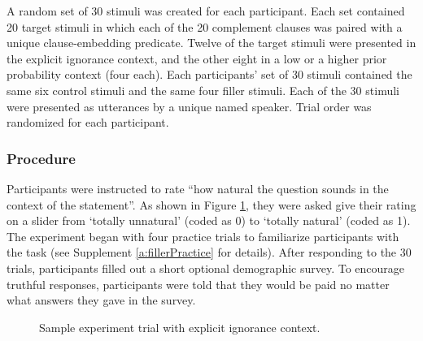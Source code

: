 \documentclass[11pt,fleqn]{article}
\newcommand{\6}{\mbox{$[\hspace*{-.6mm}[$}}
\newcommand{\9}{\mbox{$]\hspace*{-.6mm}]$}}
\begin{document}
A random set of 30 stimuli was created for each participant. Each set contained 20 target stimuli in which each of the 20 complement clauses was paired with a unique clause-embedding predicate. Twelve of the target stimuli were presented in the explicit ignorance context, and the other eight in a low or a higher prior probability context (four each). Each participants' set of 30 stimuli contained the same six control stimuli and the same four filler stimuli. Each of the 30 stimuli were presented as utterances by a unique named speaker. Trial order was randomized for each participant. 

\subsubsection{Procedure}

Participants were instructed to rate ``how natural the question sounds in the context of the statement''. As shown in Figure \ref{f:trials}, they were asked give their rating on a slider from `totally unnatural' (coded as 0) to `totally natural' (coded as 1). The experiment began with four practice trials to familiarize participants with the task (see Supplement \ref{a:fillerPractice} for details). After responding to the 30 trials, participants filled out a short optional demographic survey. To encourage truthful responses, participants were told that they would be paid no matter what answers they gave in the survey.


\begin{figure}[h]
\centering
\caption{Sample experiment trial with explicit ignorance context.}\label{f:trials}
\end{figure}
\end{document}
